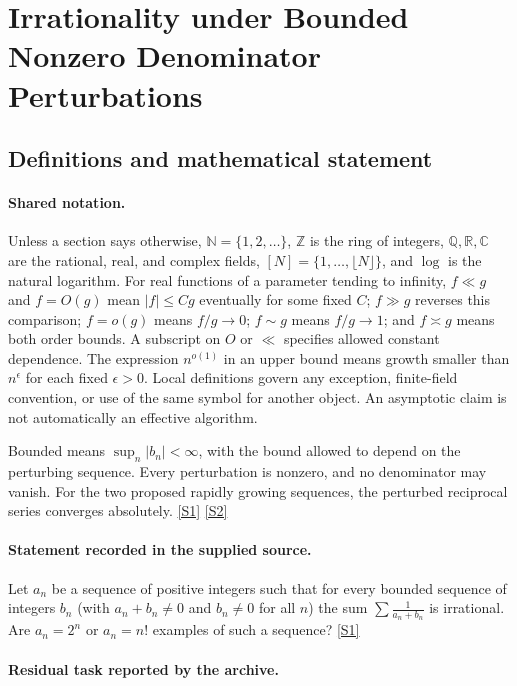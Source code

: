 \documentclass[11pt,a4paper]{article}
\newcommand{\N}{\mathbb{N}}
\newcommand{\Z}{\mathbb{Z}}
\newcommand{\Q}{\mathbb{Q}}
\newcommand{\R}{\mathbb{R}}
\newcommand{\C}{\mathbb{C}}
\newcommand{\sref}[2]{\hyperlink{source:#1:#2}{[S#2]}}
\begin{document}
\section{Irrationality under Bounded Nonzero Denominator Perturbations}\label{statement}


\subsection{Definitions and mathematical statement}

\paragraph{Shared notation.}Unless a section says otherwise, $\N=\{1,2,\ldots\}$,
$\Z$ is the ring of integers, $\Q,\R,\C$ are the rational, real, and complex
fields, $[N]=\{1,\ldots,\lfloor N\rfloor\}$, and $\log$ is the natural
logarithm. For real functions of a parameter tending to infinity,
$f\ll g$ and $f=O(g)$ mean $|f|\leq Cg$ eventually for some fixed $C$;
$f\gg g$ reverses this comparison; $f=o(g)$ means $f/g\to0$;
$f\sim g$ means $f/g\to1$; and $f\asymp g$ means both order bounds.
A subscript on $O$ or $\ll$ specifies allowed constant dependence.
The expression $n^{o(1)}$ in an upper bound means growth smaller than
$n^\epsilon$ for each fixed $\epsilon>0$. Local definitions govern any
exception, finite-field convention, or use of the same symbol for another
object. An asymptotic claim is not automatically an effective algorithm.



Bounded means $\sup_n|b_n|<\infty$, with the bound allowed to depend on the perturbing sequence. Every perturbation is nonzero, and no denominator may vanish. For the two proposed rapidly growing sequences, the perturbed reciprocal series converges absolutely. \sref{statement}{1} \sref{statement}{2}

\paragraph{Statement recorded in the supplied source.}
Let $a_n$ be a sequence of positive integers such that for every bounded sequence of integers $b_n$ (with $a_n+b_n\neq 0$ and $b_n\neq 0$ for all $n$) the sum $ \sum \frac{1}{a_n+b_n} $ is irrational. Are $a_n=2^n$ or $a_n=n!$ examples of such a sequence? \sref{statement}{1}

\paragraph{Residual task reported by the archive.}
\end{document}

